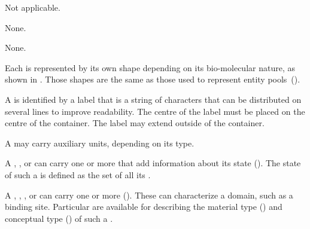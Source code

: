 \begin{glyphDescription}

\glyphSboTerm
Not applicable.

\glyphIncoming
None.

\glyphOutgoing
None.

\glyphContainer
Each  is represented by its own shape depending on its bio-molecular nature, as shown in .
Those shapes are the same as those used to represent entity pools~().

\glyphLabel
A  is identified by a label that is a string of characters that can be distributed on several lines to improve readability.
The centre of the label must be placed on the centre of the container.
The label may extend outside of the container.

\glyphAux A  may carry auxiliary units, depending on its type.

A , , or  can carry one or more  that add information about its state ().
The state of such a  is defined as the set of all its .

A , , , or  can carry one or more  ().
These can characterize a domain, such as a binding site.
Particular  are available for describing the material type () and conceptual type () of such a .

\end{glyphDescription}

